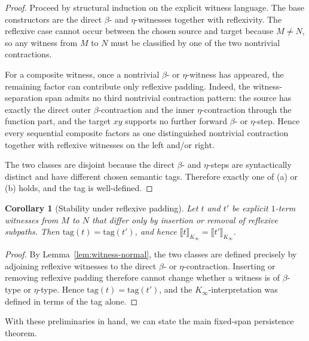 \documentclass[webpdf,traditional,large,numbered]{oup-authoring-template}
\theoremstyle{thmstyleone}%
\newtheorem{corollary}[theorem]{Corollary}
\theoremstyle{thmstyletwo}%
\theoremstyle{thmstylethree}%
\newcommand{\Kinf}{K_\infty}
\begin{document}
\begin{proof}
  Proceed by structural induction on the explicit witness language.  The base
  constructors are the direct $\beta$- and $\eta$-witnesses together with
  reflexivity.  The reflexive case cannot occur between the chosen source and
  target because $M\neq N$, so any witness from $M$ to $N$ must be classified
  by one of the two nontrivial contractions.

  For a composite witness, once a nontrivial $\beta$- or $\eta$-witness has
  appeared, the remaining factor can contribute only reflexive padding.  Indeed,
  the witness-separation span admits no third nontrivial contraction pattern: the
  source has exactly the direct outer $\beta$-contraction and the inner
  $\eta$-contraction through the function part, and the target $xy$ supports no
  further forward $\beta$- or $\eta$-step.  Hence every sequential composite
  factors as one distinguished nontrivial contraction together with reflexive
  witnesses on the left and/or right.

  The two classes are disjoint because the direct $\beta$- and $\eta$-steps are
  syntactically distinct and have different chosen semantic tags.  Therefore
  exactly one of (a) or (b) holds, and the tag is well-defined.
\end{proof}

\begin{corollary}[Stability under reflexive padding]\label{cor:tag-stable}
  Let $t$ and $t'$ be explicit $1$-term witnesses from $M$ to $N$ that differ
  only by insertion or removal of reflexive subpaths.  Then
  $\mathrm{tag}(t)=\mathrm{tag}(t')$, and hence
  $\llbracket t \rrbracket_{\Kinf} = \llbracket t' \rrbracket_{\Kinf}$.
\end{corollary}

\begin{proof}
  By Lemma~\ref{lem:witness-normal}, the two classes are defined precisely by
  adjoining reflexive witnesses to the direct $\beta$- or $\eta$-contraction.
  Inserting or removing reflexive padding therefore cannot change whether a
  witness is of $\beta$-type or $\eta$-type.  Hence
  $\mathrm{tag}(t)=\mathrm{tag}(t')$, and the $\Kinf$-interpretation was
  defined in terms of the tag alone.
\end{proof}

With these preliminaries in hand, we can state the main fixed-span persistence
theorem.
\end{document}
